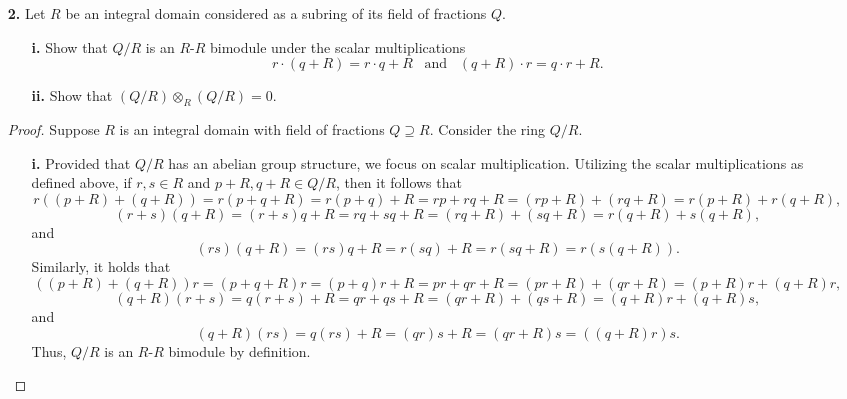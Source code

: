 \documentclass[ 12pt ]{article}
\begin{document}
\begin{enumerate}
	\item[\textbf{2.}] Let $R$ be an integral domain considered as a subring of its field of fractions $Q$.
	\begin{enumerate}
		\item[\textbf{i.}] Show that $Q/R$ is an $R$-$R$ bimodule under the scalar multiplications $$r \cdot (q + R) = r \cdot q + R\;\;\; \mathrm{and}\;\;\; (q + R) \cdot r = q \cdot r + R.$$
		\item[\textbf{ii.}] Show that $(Q/R) \otimes_R (Q/R) = 0$.
	\end{enumerate}

		\begin{proof}
			Suppose $R$ is an integral  domain with field of fractions $Q \supseteq R$. Consider the ring $Q/R$.
			\begin{enumerate}
				\item[\textbf{i.}] Provided that $Q/R$ has an abelian group structure, we focus on scalar multiplication. Utilizing the scalar multiplications as defined above, if $r, s \in R$ and $p + R, q + R \in Q/R$, then it follows that $$r((p + R) + (q + R)) = r(p + q + R) = r(p + q) + R = rp + rq + R = (rp + R) + (rq + R) = r(p + R) + r(q + R),$$ $$(r + s)(q + R) = (r + s)q + R = rq + sq + R = (rq + R) + (sq + R) = r(q + R) + s(q + R),$$ and $$(rs)(q + R) = (rs)q + R = r(sq) + R = r(sq + R) = r(s(q + R)).$$ Similarly, it holds that $$((p + R) + (q + R))r = (p + q + R)r = (p + q)r + R = pr + qr + R = (pr + R) + (qr + R) = (p + R)r + (q + R)r,$$ $$(q + R)(r + s) = q(r + s) + R = qr + qs + R = (qr + R) + (qs + R) = (q + R)r + (q + R)s,$$ and $$(q + R)(rs) = q(rs) + R = (qr)s + R = (qr + R)s = ((q + R)r)s.$$ Thus, $Q/R$ is an $R$-$R$ bimodule by definition.


\end{enumerate}
\end{proof}
\end{enumerate}
\end{document}
